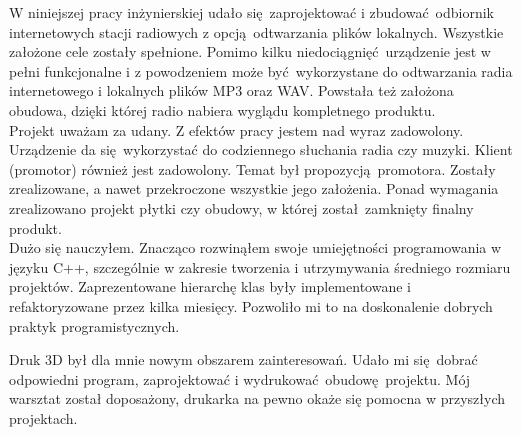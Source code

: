 \documentclass[12pt]{report}
\begin{document}
		W niniejszej pracy inżynierskiej udało się zaprojektować i zbudować odbiornik internetowych stacji radiowych z opcją odtwarzania plików lokalnych.
		Wszystkie założone cele zostały spełnione. Pomimo kilku niedociągnięć urządzenie jest w pełni funkcjonalne i z powodzeniem może być wykorzystane do odtwarzania radia internetowego i lokalnych plików MP3 oraz WAV. Powstała też założona obudowa, dzięki której radio nabiera wyglądu kompletnego produktu.
		$ $\\
		
		Projekt uważam za udany. 
		Z efektów pracy jestem nad wyraz zadowolony. Urządzenie da się wykorzystać do codziennego słuchania radia czy muzyki.
		Klient (promotor) również jest zadowolony. Temat był propozycją promotora. Zostały zrealizowane, a nawet przekroczone wszystkie jego założenia. Ponad wymagania zrealizowano projekt płytki czy obudowy, w której został zamknięty finalny produkt.
		$ $\\
		
		Dużo się nauczyłem.
		Znacząco rozwinąłem swoje umiejętności programowania w języku C++, szczególnie w zakresie tworzenia i utrzymywania średniego rozmiaru projektów. Zaprezentowane hierarchę klas były implementowane i refaktoryzowane przez kilka miesięcy. Pozwoliło mi to na doskonalenie dobrych praktyk programistycznych.
		
		$ $\\
		Druk 3D był dla mnie nowym obszarem zainteresowań. Udało mi się dobrać odpowiedni program, zaprojektować i wydrukować obudowę projektu. 
		Mój warsztat został doposażony, drukarka na pewno okaże się pomocna w przyszłych projektach.
			
		
\end{document}
